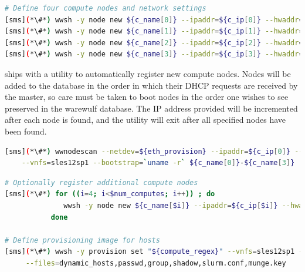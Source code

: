 \documentclass[letterpaper]{article}
\begin{document}



\begin{lstlisting}[language=bash,keywords={},upquote=true,basicstyle=\footnotesize\ttfamily]
# Define four compute nodes and network settings 
[sms](*\#*) wwsh -y node new ${c_name[0]} --ipaddr=${c_ip[0]} --hwaddr=${c_mac[0]} -D ${eth_provision}
[sms](*\#*) wwsh -y node new ${c_name[1]} --ipaddr=${c_ip[1]} --hwaddr=${c_mac[1]} -D ${eth_provision}
[sms](*\#*) wwsh -y node new ${c_name[2]} --ipaddr=${c_ip[2]} --hwaddr=${c_mac[2]} -D ${eth_provision}
[sms](*\#*) wwsh -y node new ${c_name[3]} --ipaddr=${c_ip[3]} --hwaddr=${c_mac[3]} -D ${eth_provision}
\end{lstlisting}

\begin{center}
\begin{tcolorbox}[]
\small
\Warewulf{} ships with a utility to automatically register new compute nodes.
Nodes will be added to the \Warewulf{} database in the order in which their
DHCP requests are received by the master, so care must be taken to boot nodes
in the order one wishes to see preserved in the warewulf database. The IP
address provided will be incremented after each node is found, and the utility
will exit after all specified nodes have been found.
\begin{lstlisting}[language=bash,keywords={},upquote=true,basicstyle=\footnotesize\ttfamily,]
[sms](*\#*) wwnodescan --netdev=${eth_provision} --ipaddr=${c_ip[0]} --netmask=${internal_netmask} \
    --vnfs=sles12sp1 --bootstrap=`uname -r` ${c_name[0]}-${c_name[3]}
\end{lstlisting}
\end{tcolorbox}
\end{center}

\begin{lstlisting}[language=bash,keywords={},upquote=true,basicstyle=\footnotesize\ttfamily]
# Optionally register additional compute nodes
[sms](*\#*) for ((i=4; i<$num_computes; i++)) ; do
              wwsh -y node new ${c_name[$i]} --ipaddr=${c_ip[$i]} --hwaddr=${c_mac[$i]} -D ${eth_provision}
           done

# Define provisioning image for hosts
[sms](*\#*) wwsh -y provision set "${compute_regex}" --vnfs=sles12sp1 --bootstrap=`uname -r` \
     --files=dynamic_hosts,passwd,group,shadow,slurm.conf,munge.key
\end{lstlisting}
\end{document}
